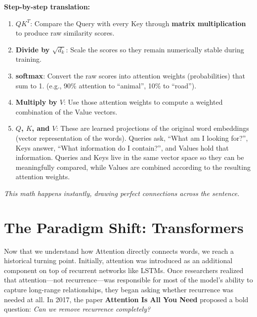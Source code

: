 \documentclass[11pt]{article}
\begin{document}
\textbf{Step-by-step translation:}
\begin{enumerate}[leftmargin=*, itemsep=0.1in]
    \item \textbf{$QK^T$}: Compare the Query with every Key through \textbf{matrix multiplication} to produce raw similarity scores.
    \item \textbf{Divide by $\sqrt{d_k}$}: Scale the scores so they remain numerically stable during training.
    \item \textbf{softmax}: Convert the raw scores into attention weights (probabilities) that sum to 1.
          (e.g., 90\% attention to ``animal'', 10\% to ``road'').
    \item \textbf{Multiply by $V$}: Use those attention weights to compute a weighted combination of the Value vectors.
    \item \textbf{$Q$, $K$, and $V$}: These are learned projections of the original word embeddings (vector representation of the words). Queries ask, ``What am I looking for?'', Keys answer, ``What information do I contain?'', and Values hold that information. Queries and Keys live in the same vector space so they can be meaningfully compared, while Values are combined according to the resulting attention weights.
\end{enumerate}

\vspace{0.1in}
\textit{This math happens instantly, drawing perfect connections across the sentence.}

\newpage

\section*{The Paradigm Shift: Transformers}

\vspace{0.05in}

Now that we understand how Attention directly connects words, we reach a historical turning point. Initially, attention was introduced as an additional component on top of recurrent networks like LSTMs. Once researchers realized that attention—not recurrence—was responsible for most of the model's ability to capture long-range relationships, they began asking whether recurrence was needed at all. In 2017, the paper \textbf{Attention Is All You Need} proposed a bold question: \textit{Can we remove recurrence completely?}
\end{document}
